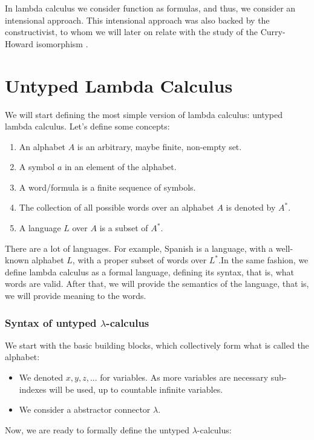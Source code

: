 In lambda calculus we consider function as formulas, and thus, we consider an intensional approach. This intensional approach was also backed by the constructivist, to whom we will later on relate with the study of the Curry-Howard isomorphism  \cite{howard1980formulae}.\\


\section{Untyped Lambda Calculus }
We will start defining the most simple version of lambda calculus: untyped lambda calculus. Let's define some concepts:


\begin{enumerate}
\item An alphabet $A$ is an arbitrary, maybe finite, non-empty set.
\item A symbol $a$ in an element of the alphabet.
\item A word/formula is a finite sequence of symbols.
\item The collection of all possible words over an alphabet $A$ is denoted by $A^*$.
\item A language $L$ over $A$  is a subset of $A^*.$
\end{enumerate}

There are a lot of languages. For example, Spanish is a language, with a well-known alphabet $L$, with a proper subset of words over $L^*$.In the same fashion, we define lambda calculus as a formal language, defining its syntax, that is, what words are valid. After that, we will provide the semantics of the language, that is, we will provide meaning to the words.\\


\subsubsection{Syntax of untyped $\lambda$-calculus}
We start with the basic building blocks, which collectively form what is
called the alphabet:

\begin{itemize}
\item We denoted $x, y, z,...$ for variables. As more variables are necessary sub-indexes will be used, up to countable infinite variables.
\item We consider a abstractor connector $\lambda$.
\end{itemize}
Now, we are ready to formally define the untyped $\lambda$-calculus:

